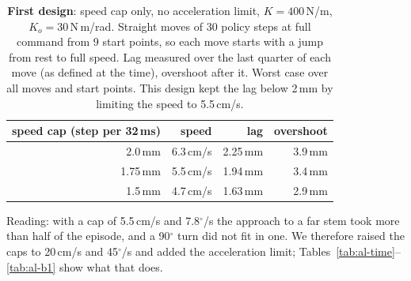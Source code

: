 \begin{table}[h]
  \centering
  \caption{\textbf{First design}: speed cap only, no acceleration limit, $K = 400$\,N/m, $K_o = 30$\,N\,m/rad. Straight
  moves of 30 policy steps at full command from 9 start points, so each move starts with a jump from rest to full speed.
  Lag measured over the last quarter of each move (as defined at the time), overshoot after it. Worst case over all
  moves and start points. This design kept the lag below 2\,mm by limiting the speed to 5.5\,cm/s.}
  \label{tab:al-first}
  {\renewcommand{\arraystretch}{1.15}
  \begin{tabular}{rrrr}
    \toprule
    speed cap (step per 32\,ms) & speed & lag & overshoot \\
    \midrule
    2.0\,mm  & 6.3\,cm/s & 2.25\,mm & 3.9\,mm \\
    1.75\,mm & 5.5\,cm/s & 1.94\,mm & 3.4\,mm \\
    1.5\,mm  & 4.7\,cm/s & 1.63\,mm & 2.9\,mm \\
    \bottomrule
  \end{tabular}}

  \smallskip
  {\small Reading: with a cap of 5.5\,cm/s and 7.8$^\circ$/s the approach to a far stem took more than half of the
  episode, and a 90$^\circ$ turn did not fit in one. We therefore raised the caps to 20\,cm/s and 45$^\circ$/s and
  added the acceleration limit; Tables~\ref{tab:al-time}--\ref{tab:al-b1} show what that does.}
\end{table}

